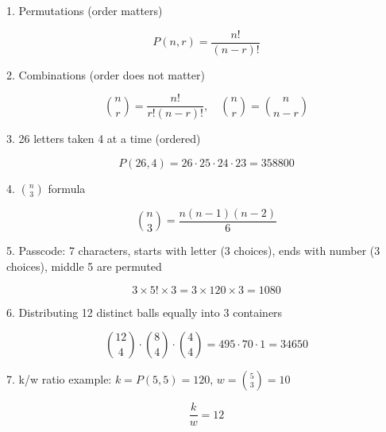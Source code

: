 1. Permutations (order matters)

$$ P(n,r) = \frac{n!}{(n-r)!} $$

2. Combinations (order does not matter)

$$ \binom{n}{r} = \frac{n!}{r!(n-r)!}, \quad \binom{n}{r} = \binom{n}{n-r} $$

3. 26 letters taken 4 at a time (ordered)

$$ P(26,4) = 26 \cdot 25 \cdot 24 \cdot 23 = 358800 $$

4. $\binom{n}{3}$ formula

$$ \binom{n}{3} = \frac{n(n-1)(n-2)}{6} $$

5. Passcode: 7 characters, starts with letter (3 choices), ends with number (3 choices), middle 5 are permuted

$$ 3 \times 5! \times 3 = 3 \times 120 \times 3 = 1080 $$

6. Distributing 12 distinct balls equally into 3 containers

$$ \binom{12}{4} \cdot \binom{8}{4} \cdot \binom{4}{4} = 495 \cdot 70 \cdot 1 = 34650 $$

7. k/w ratio example: $k = P(5,5) = 120$, $w = \binom{5}{3} = 10$

$$ \frac{k}{w} = 12 $$
